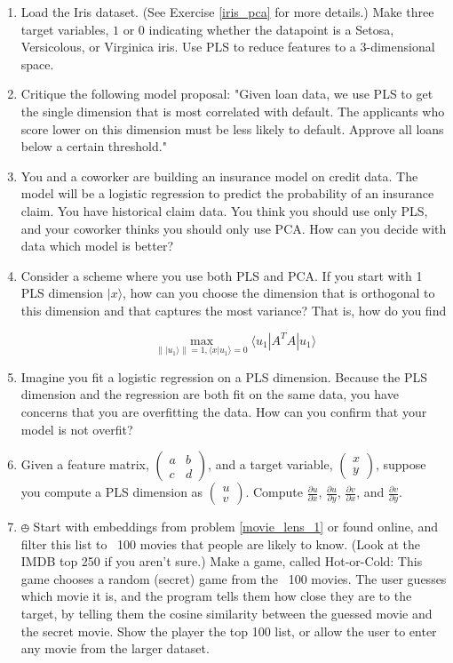 \documentclass{amsbook}
\begin{document}
\begin{enumerate}
\item \label{iris_pls} Load the Iris dataset.  (See Exercise \ref{iris_pca} for more details.)  Make three target variables, $1$ or $0$ indicating whether the datapoint is a Setosa, Versicolous, or Virginica iris.  Use PLS to reduce features to a $3$-dimensional space.
\item Critique the following model proposal:  "Given loan data, we use PLS to get the single dimension that is most correlated with default.  The applicants who score lower on this dimension must be less likely to default.  Approve all loans below a certain threshold."
\item You and a coworker are building an insurance model on credit data.  The model will be a logistic regression to predict the probability of an insurance claim.  You have historical claim data.  You think you should use only PLS, and your coworker thinks you should only use PCA.  How can you decide with data which model is better?
\item \label{pls_pca_ex} Consider a scheme where you use both PLS and PCA.  If you start with 1 PLS dimension $|x\rangle$, how can you choose the dimension that is orthogonal to this dimension and that captures the most variance?  That is, how do you find

$$
\max_{\left\||u_1\rangle\right\|=1, \langle x|u_1\rangle=0}\langle u_1|A^TA|u_1\rangle
$$
\item Imagine you fit a logistic regression on a PLS dimension.  Because the PLS dimension and the regression are both fit on the same data, you have concerns that you are overfitting the data.  How can you confirm that your model is not overfit?
\item Given a feature matrix, $\left(\begin{array}{cc}a&b\\c&d\end{array}\right)$, and a target variable, $\left(\begin{array}{c}x\\y\end{array}\right)$, suppose you compute a PLS dimension as $\left(\begin{array}{c}u\\v\end{array}\right)$.  Compute $\frac{\partial u}{\partial x}$, $\frac{\partial u}{\partial y}$, $\frac{\partial v}{\partial x}$, and $\frac{\partial v}{\partial y}$.
\item $\obot$ Start with embeddings from problem \ref{movie_lens_1} or found online, and filter this list to ~100 movies that people are likely to know.  (Look at the IMDB top 250 if you aren’t sure.)  Make a game, called Hot-or-Cold:  This game chooses a random (secret) game from the ~100 movies.  The user guesses which movie it is, and the program tells them how close they are to the target, by telling them the cosine similarity between the guessed movie and the secret movie.  Show the player the top 100 list, or allow the user to enter any movie from the larger dataset.
\end{enumerate}
\end{document}
